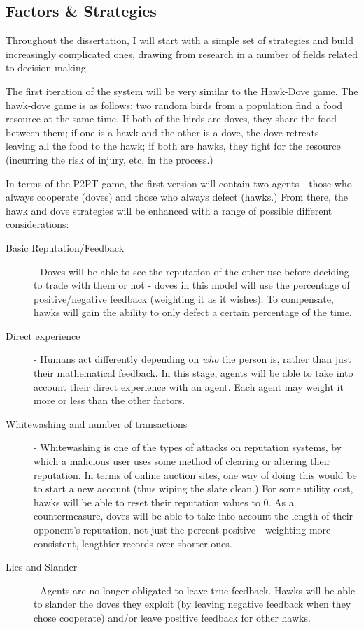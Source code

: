 \documentclass{article}
\begin{document}
\subsection{Factors \& Strategies}
\label{sec:factors-strategies}
Throughout the dissertation, I will start with a simple set of strategies and build increasingly complicated ones, drawing from research in a number of fields related to decision making.

The first iteration of the system will be very similar to the Hawk-Dove game\cite{smith1973lhe}. The hawk-dove game is as follows: two random birds from a population find a food resource at the same time. If both of the birds are doves, they share the food between them; if one is a hawk and the other is a dove, the dove retreats - leaving all the food to the hawk; if both are hawks, they fight for the resource (incurring the risk of injury, etc, in the process.)

In terms of the P2PT game, the first version will contain two agents - those who always cooperate (doves) and those who always defect (hawks.) From there, the hawk and dove strategies will be enhanced with a range of possible different considerations:
\begin{description}
	\item[Basic Reputation/Feedback] - Doves will be able to see the reputation of the other use before deciding to trade with them or not - doves in this model will use the percentage of positive/negative feedback (weighting it as it wishes). To compensate, hawks will gain the ability to only defect a certain percentage of the time.
	\item[Direct experience] - Humans act differently depending on \emph{who} the person is\cite{fehr2003nature}, rather than just their mathematical feedback. In this stage, agents will be able to take into account their direct experience with an agent. Each agent may weight it more or less than the other factors.
	\item[Whitewashing and number of transactions] - Whitewashing\cite{hoffman2009survey} is one of the types of attacks on reputation systems, by which a malicious user uses some method of clearing or altering their reputation. In terms of online auction sites, one way of doing this would be to start a new account (thus wiping the slate clean.) For some utility cost, hawks will be able to reset their reputation values to 0. As a countermeasure, doves will be able to take into account the length of their opponent's reputation, not just the percent positive - weighting more consistent, lengthier records over shorter ones.
	\item[Lies and Slander] - Agents are no longer obligated to leave true feedback. Hawks will be able to slander\cite{hoffman2009survey} the doves they exploit (by leaving negative feedback when they chose cooperate) and/or leave positive feedback for other hawks.
\end{description}
\end{document}
